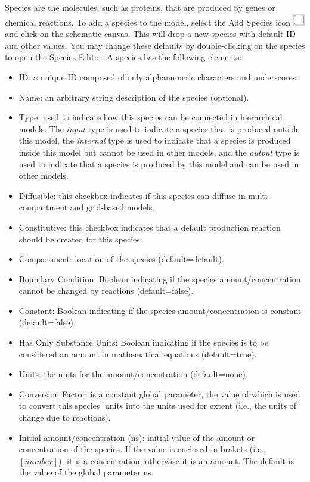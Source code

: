 \documentclass[titlepage,11pt]{article}
\begin{document}
\noindent
Species are the molecules, such as proteins, that are produced by genes or chemical reactions.  To add a species to the model, select the Add Species icon \includegraphics{../gui/icons/modelview/add_species_selected} and click on the schematic canvas.  This will drop a new species with default ID and other values.  You may change these defaults by double-clicking on the species to open the Species Editor.  A species has the following elements:
\begin{itemize} 
\item ID: a unique ID composed of only alphanumeric characters and underscores.
\item Name: an arbitrary string description of the species (optional).
\item Type: used to indicate how this species can be connected in hierarchical models.  The \emph{input} type is used to indicate a species that is produced outside this model, the \emph{internal} type is used to indicate that a species is produced inside this model but cannot be used in other models, and the \emph{output} type is used to indicate that a species is produced by this model and can be used in other models. 
\item Diffusible: this checkbox indicates if this species can diffuse in multi-compartment and grid-based models.
\item Constitutive: this checkbox indicates that a default production reaction should be created for this species.
\item Compartment: location of the species (default=default).
\item Boundary Condition: Boolean indicating if the species amount/concentration cannot be changed by reactions (default=false).
\item Constant: Boolean indicating if the species amount/concentration is constant (default=false).
\item Has Only Substance Units: Boolean indicating if the species is to be considered an amount in mathematical equations (default=true).
\item Units: the units for the amount/concentration (default=none).
\item Conversion Factor: is a constant global parameter, the value of which is used to convert this species' units into the units used for extent (i.e., the units of change due to reactions).
\item Initial amount/concentration (ns): initial value of the amount or concentration of the species.  If the value is enclosed in brakets (i.e., $[number]$), it is a concentration, otherwise it is an amount.  The default is the value of the global parameter ns.

\end{itemize}
\end{document}
